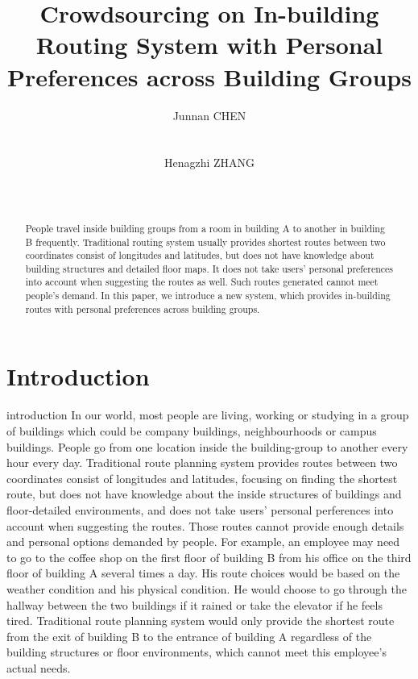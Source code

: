 \documentclass{sigchi}
\begin{document}
\title{Crowdsourcing on In-building Routing System with Personal Preferences across Building Groups}

\author{
  \alignauthor Junnan CHEN\\
    \\
    \\
  \alignauthor Henagzhi ZHANG\\
    \\
    \\
}

\maketitle

\begin{abstract}
People travel inside building groups from a room in building A to another in building B frequently. Traditional routing system usually provides shortest routes between two coordinates consist of longitudes and latitudes, but does not have knowledge about building structures and detailed floor maps. It does not take users' personal preferences into account when suggesting the routes as well. Such routes generated cannot meet people’s demand. In this paper, we introduce a new system, which provides in-building routes with personal preferences across building groups.
\end{abstract}


\section{Introduction}

introduction
In our world, most people are living, working or studying in a group of buildings which could be company buildings, neighbourhoods or campus buildings. People go from one location inside the building-group to another every hour every day. Traditional route planning system provides routes between two coordinates consist of longitudes and latitudes, focusing on finding the shortest route, but does not have knowledge about the inside structures of buildings and floor-detailed environments, and does not take users' personal perferences into account when suggesting the routes. Those routes cannot provide enough details and personal options demanded by people.
For example, an employee may need to go to the coffee shop on the first floor of building B from his office on the third floor of building A several times a day. His route choices would be based on the weather condition and his physical condition. He would choose to go through the hallway between the two buildings if it rained or take the elevator if he feels tired. Traditional route planning system would only provide the shortest route from the exit of building B to the entrance of building A regardless of the building structures or floor environments, which cannot meet this employee's actual needs.
\end{document}
